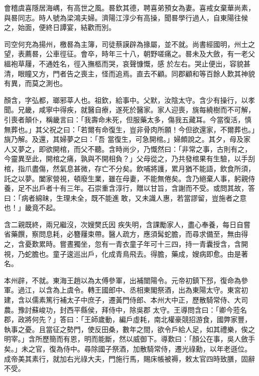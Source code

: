 \begin{pinyinscope}
 會稽虞喜隱居海嵎，有高世之風。晷欽其德，聘喜弟預女為妻。喜戒女棄華尚素，與晷同志。時人號為梁鴻夫婦。濟陽江淳少有高操，聞晷學行過人，自東陽往候之，始面，便終日譚宴，結歡而別。



 司空何充為揚州，檄晷為主簿，司徒蔡謨辟為掾屬，並不就。尚書經國明，州土之望，表薦晷，公車徑征。會卒，時年三十八，朝野嗟痛之。晷未及大斂，有一老父縕袍草屨，不通姓名，徑入撫柩而哭，哀聲慷慨，感
 於左右。哭止便出，容貌甚清，眼瞳又方，門者告之喪主，怪而追焉。直去不顧。同郡顧和等百餘人歎其神貌有異，而莫之測也。



 顏含，字弘都，瑯邪莘人也。祖欽，給事中。父默，汝陰太守。含少有操行，以孝聞。兄畿，咸寧中得疾，就醫自療，遂死於醫家。家人迎喪，旐每繞樹而不可解，引喪者顛仆，稱畿言曰：「我壽命未死，但服藥太多，傷我五藏耳。今當復活，慎無葬也。」其父祝之曰：「若爾有命復生，豈非骨肉所願！今但欲還家，不爾葬也。」旐乃解。及還，其婦夢之曰：「吾
 當復生，可急開棺。」婦頗說之。其夕，母及家人又夢之，即欲開棺，而父不聽。含時尚少，乃慨然曰：「非常之事，古則有之，今靈異至此，開棺之痛，孰與不開相負？」父母從之，乃共發棺果有生驗，以手刮棺，指爪盡傷，然氣息甚微，存亡不分矣。飲哺將護，累月猶不能語，飲食所須，託之以夢。闔家營視，頓廢生業，雖在母妻，不能無倦矣。含乃絕棄人事，躬親侍養，足不出戶者十有三年。石崇重含淳行，贈以甘旨，含謝而不受。或問其故，答曰：「病者綿昧，生理未全，既不能進敢，又未識人惠，若當謬留，豈施者之意也！」畿竟不起。



 含二親既終，兩兄繼沒，次嫂樊氏因
 疾失明，含課勵家人，盡心奉養，每日自嘗省藥饌，察問息耗，必簪屨束帶。醫人疏方，應須髯蛇膽，而尋求備至，無由得之，含憂歎累時。嘗晝獨坐，忽有一青衣童子年可十三四，持一青囊授含，含開視，乃蛇膽也。童子逡巡出戶，化成青鳥飛去。得膽，藥成，嫂病即愈。由是著名。



 本州辟，不就。東海王趙以為太傅參軍，出補闓陽令。元帝初鎮下邳，復命為參軍。過江，以含為上虞令。轉王國郎中、丞相東閣祭酒，出為東陽太守。東宮初建，含以儒素篤行補太子中庶子，遷黃門侍郎、本州大中正，歷散騎常侍、大司農。豫討蘇峻功，封西平縣侯，拜侍中，除吳郡
 太守。王導問含曰：「卿今蒞名郡，政將何先？」答曰：「王師歲動，編戶虛耗，南北權豪競招游食，國弊家豐，執事之憂。且當征之勢門，使反田桑，數年之間，欲令戶給人足，如其禮樂，俟之明宰。」含所歷簡而有恩，明而能斷，然以威御下。導歎曰：「顏公在事，吳人斂手矣。」未之官，復為侍中。尋除國子祭酒，加散騎常侍，遷光祿勳，以年老遜位。成帝美其素行，就加右光祿大夫，門施行馬，賜床帳被褥，敕太官四時致膳，固辭不受。




\end{pinyinscope}
